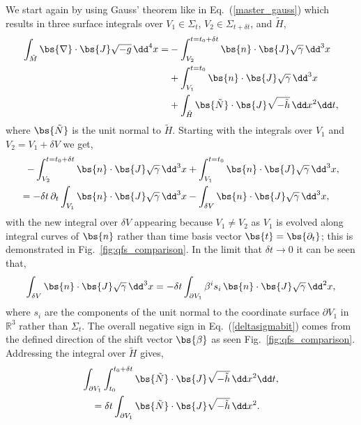 We start again by using Gauss' theorem like in Eq.~(\ref{master_gauss}) which results in three surface integrals over $V_1\in\Sigma_t$, $V_2\in\Sigma_{t+\delta t}$, and $\tilde{H}$,
\begin{align} \begin{split}
\int_{\tilde{M}} \bs{\nabla} \cdot \bs{J} \sqrt{-g} \, \dd^4 x =& -\int^{t=t_0+\delta t}_{V_2} \bs{n} \cdot \bs{J} \sqrt{\gamma} \,\dd^3 x \\
                                                             & +\int^{t=t_0}_{V_1} \bs{n} \cdot \bs{J} \sqrt{\gamma} \,\dd^3 x \\ 
                                                             & +\int_{\tilde{H}} \bs{\tilde N} \cdot \bs{J} \sqrt{-\tilde{h}} \, \dd x^2 \dd t,
\end{split}\end{align}
where $\bs{\tilde{N}}$ is the unit normal to $\tilde{H}$. Starting with the integrals over $V_1$ and $V_2 = V_1 + \delta V$ we get, 
\begin{align}
-\int^{t=t_0+\delta t}_{V_2} \bs{n} \cdot \bs{J} \sqrt{\gamma} \,\dd^3 x  &+\int^{t=t_0}_{V_1} \bs{n} \cdot \bs{J} \sqrt{\gamma} \,\dd^3 x, \\ 
 \label{dsigma dt bit}=-\delta t \,\partial_t \int_{V_1} \bs{n} \cdot \bs{J} \sqrt{\gamma} \,\dd^3 x  &-\int_{\delta V} \bs{n} \cdot \bs{J} \sqrt{\gamma} \,\dd^3 x, 
\end{align}
with the new integral over $\delta V$ appearing because $V_1\neq V_2$ as $V_1$ is evolved along integral curves of $\bs{n}$ rather than time basis vector $\bs{t}=\bs{\partial_t}$; this is demonstrated in Fig.~\ref{fig:qfs_comparison}. In the limit that $\delta t \rightarrow 0$ it can be seen that,
\begin{align} \label{deltasigmabit}
\int_{\delta V} \bs{n} \cdot \bs{J} \sqrt{\gamma} \,\dd^3 x = -\delta t \int_{\partial V_1} \beta^i s_i\, \bs{n} \cdot \bs{J} \sqrt{\gamma} \,\dd^2 x,
\end{align}
where $s_i$ are the components of the unit normal to the coordinate surface $\partial V_1$ in $\mathbb{R}^3$ rather than $\Sigma_t$. The overall negative sign in Eq.~(\ref{deltasigmabit}) comes from the defined direction of the shift vector $\bs{\beta}$ as seen Fig.~\ref{fig:qfs_comparison}. Addressing the integral over $\tilde{H}$ gives,  
\begin{align}
 \int_{\partial V_1}\int_{t_0}^{t_0 + \delta t}\bs{\tilde N} &\cdot \bs{J} \sqrt{-\tilde{h}} \, \dd x^2 \dd t, \nonumber \\
 \label{htildepart}=\delta t \int_{\partial V_1} \bs{\tilde N} &\cdot \bs{J} \sqrt{-\tilde{h}} \, \dd x^2.  
\end{align}
